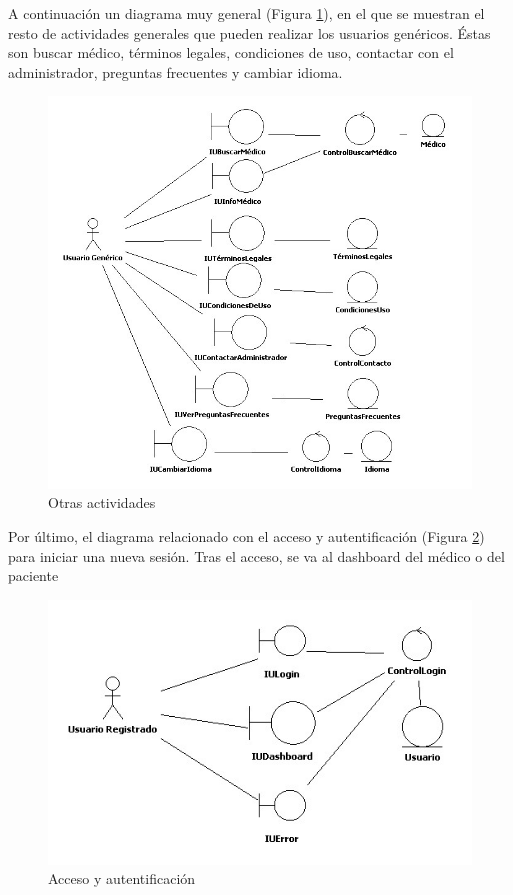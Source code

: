 \documentclass[a4paper,oneside,11pt]{book}
\begin{document}
		A continuación un diagrama muy general (Figura \ref{fig:col_clase9}), en el que se muestran el resto de actividades generales que pueden realizar los usuarios genéricos. Éstas son buscar médico, términos legales, condiciones de uso, contactar con el administrador, preguntas frecuentes y cambiar idioma.
		\begin{figure}[H]
		  \centering
		    \includegraphics[width=16cm]{img/jpg/clases/8_Varios.jpg}
		  \caption{Otras actividades}
		  \label{fig:col_clase9}
		\end{figure}
		
		\newpage
		Por último, el diagrama relacionado con el acceso y autentificación (Figura \ref{fig:col_clase10}) para iniciar una nueva sesión. Tras el acceso, se va al dashboard del médico o del paciente
		\begin{figure}[H]
		  \centering
		    \includegraphics[width=12cm]{img/jpg/clases/9_AccesoYAutentificacion.jpg}
		  \caption{Acceso y autentificación}
		  \label{fig:col_clase10}
		\end{figure}
	
\end{document}
